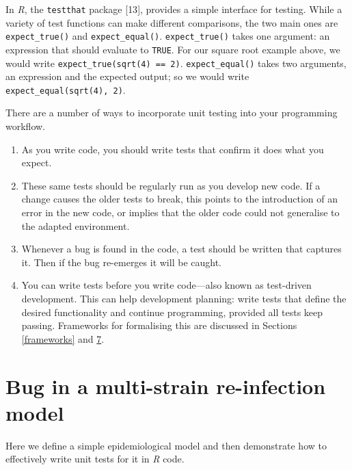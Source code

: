 \documentclass[10pt,letterpaper]{article}
\providecommand{\tightlist}{%
  \setlength{\itemsep}{0pt}\setlength{\parskip}{0pt}}
\begin{document}
In \emph{R}, the \texttt{testthat} package {[}13{]}, provides a simple interface for testing.
While a variety of test functions can make different comparisons, the two main ones are \texttt{expect\_true()} and \texttt{expect\_equal()}.
\texttt{expect\_true()} takes one argument: an expression that should evaluate to \texttt{TRUE}.
For our square root example above, we would write \texttt{expect\_true(sqrt(4)\ ==\ 2)}.
\texttt{expect\_equal()} takes two arguments, an expression and the expected output;
so we would write \texttt{expect\_equal(sqrt(4),\ 2)}.

There are a number of ways to incorporate unit testing into your programming workflow.

\begin{enumerate}
\def\labelenumi{\arabic{enumi}.}
\tightlist
\item
  As you write code, you should write tests that confirm it does what you expect.
\item
  These same tests should be regularly run as you develop new code.
  If a change causes the older tests to break, this points to the introduction of an error in the new code, or implies that the older code could not generalise to the adapted environment.
\item
  Whenever a bug is found in the code, a test should be written that captures it.
  Then if the bug re-emerges it will be caught.
\item
  You can write tests before you write code---also known as test-driven development.
  This can help development planning: write tests that define the desired functionality and continue programming, provided all tests keep passing.
  Frameworks for formalising this are discussed in Sections \ref{frameworks} and \href{ci}{7}.
\end{enumerate}

\hypertarget{bug-in-a-multi-strain-re-infection-model}{%
\section{Bug in a multi-strain re-infection model}\label{bug-in-a-multi-strain-re-infection-model}}

Here we define a simple epidemiological model and then demonstrate how to effectively write unit tests for it in \emph{R} code.
\end{document}
